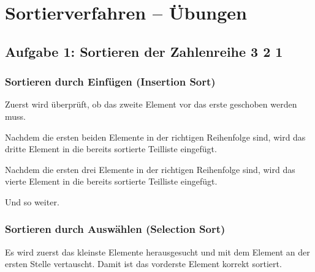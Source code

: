 \clearpage

\rehead[]{\textcolor{lightblue}{AvHG, Inf, My}}
\lohead[]{\textcolor{lightblue}{AvHG, Inf, My}}

\section{Sortierverfahren -- Übungen}

\subsection{Aufgabe 1: Sortieren der Zahlenreihe  3 2 1\grqq}

\subsubsection{Sortieren durch Einfügen (Insertion Sort)}

Zuerst wird überprüft, ob das zweite Element vor das erste geschoben werden
muss.

Nachdem die ersten beiden Elemente in der richtigen Reihenfolge sind, wird das
dritte Element in die bereits sortierte Teilliste eingefügt.

Nachdem die ersten drei Elemente in der richtigen Reihenfolge sind, wird das
vierte Element in die bereits sortierte Teilliste eingefügt.

Und so weiter.

\subsubsection{Sortieren durch Auswählen (Selection Sort)}

Es wird zuerst das kleinste Elemente herausgesucht und mit dem Element an der
ersten Stelle vertauscht. Damit ist das vorderste Element korrekt sortiert.

